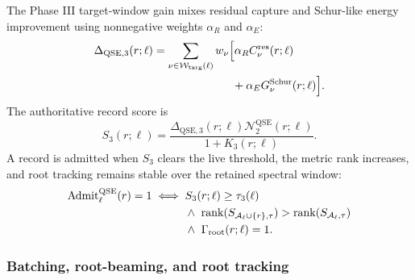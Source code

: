\documentclass[
  reprint,
  amsmath,
  amssymb,
  aps,
  pra,
  nofootinbib,
  superscriptaddress,
  floatfix
]{revtex4-2}
\newcommand{\Acal}{\mathcal{A}}
\newcommand{\Wcal}{\mathcal{W}}
\newcommand{\qse}{\mathrm{QSE}}
\newcommand{\rank}{\operatorname{rank}}
\begin{document}
The Phase III target-window gain mixes residual capture and Schur-like energy improvement using nonnegative weights $\alpha_R$ and $\alpha_E$:
\begin{equation}
\begin{aligned}
\Delta_{\qse,3}(r;\ell)
&=
\sum_{\nu\in\Wcal_{\rm targ}(\ell)}
w_\nu
\Bigl[
\alpha_R C_\nu^{\rm res}(r;\ell)
\\
&\hspace{7em}
+\alpha_E G_\nu^{\rm Schur}(r;\ell)
\Bigr].
\end{aligned}
\label{eq:qse_phase3_gain}
\end{equation}
The authoritative record score is
\begin{equation}
S_3(r;\ell)=
\frac{
\Delta_{\qse,3}(r;\ell)\mathcal N_2^{\qse}(r;\ell)
}{
1+K_3(r;\ell)
}.
\label{eq:qse_phase3_score}
\end{equation}
A record is admitted when $S_3$ clears the live threshold, the metric rank increases, and root tracking remains stable over the retained spectral window:
\begin{equation}
\begin{aligned}
\operatorname{Admit}^{\qse}_\ell(r)=1
\iff{}&
S_3(r;\ell)\ge\tau_3(\ell)
\\
&\wedge\
\rank(S_{\Acal_\ell\cup\{r\},\tau})
>
\rank(S_{\Acal_\ell,\tau})
\\
&\wedge\
\Gamma_{\rm root}(r;\ell)=1 .
\end{aligned}
\label{eq:qse_admit}
\end{equation}

\subsubsection{Batching, root-beaming, and root tracking}
\end{document}
